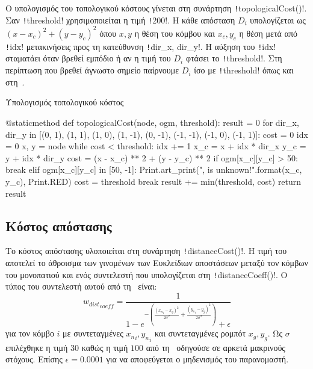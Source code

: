 Ο υπολογισμός του τοπολογικού κόστους γίνεται στη συνάρτηση \texttt!topologicalCost()!.
Σαν \texttt!threshold! χρησιμοποιείται η τιμή \texttt!200!.
Η κάθε απόσταση $D_i$ υπολογίζεται ως $(x-x_c)^2 + (y-y_c)^2$ όπου $x, y$ η θέση του κόμβου και $x_c, y_c$ η θέση μετά από \texttt!idx! μετακινήσεις προς τη κατεύθυνση \texttt!dir_x, dir_y!.
Η αύξηση του \texttt!idx! σταματάει όταν βρεθεί εμπόδιο ή αν η τιμή του $D_i$ φτάσει το \texttt!threshold!.
Στη περίπτωση που βρεθεί άγνωστο σημείο παίρνουμε $D_i$ ίσο με \texttt!threshold! όπως και στη~\cite{etsardou-phd}.
\begin{code}
\caption{Υπολογισμός τοπολογικού κόστος}
\begin{pythoncode}
@staticmethod
def topologicalCost(node, ogm, threshold):
    result = 0
    for dir_x, dir_y in [(0, 1), (1, 1), (1, 0), (1, -1), (0, -1), (-1, -1), (-1, 0), (-1, 1)]:
        cost = 0
        idx = 0
        x, y = node
        while cost < threshold:
            idx += 1
            x_c = x + idx * dir_x
            y_c = y + idx * dir_y
            cost = (x - x_c) ** 2 + (y - y_c) ** 2
            if ogm[x_c][y_c] > 50:
                break
            elif ogm[x_c][y_c] in [50, -1]:
                Print.art_print("{},{} is unknown!".format(x_c, y_c), Print.RED)
                cost = threshold
                break
        result += min(threshold, cost)
    return result
\end{pythoncode}
\end{code}

\subsection{Κόστος απόστασης}\label{section:distance-cost}
Το κόστος απόστασης υλοποιείται στη συνάρτηση \texttt!distanceCost()!.
Η τιμή του αποτελεί το άθροισμα των γινομένων των Ευκλείδιων αποστάσεων μεταξύ τον κόμβων του μονοπατιού και ενός συντελεστή που υπολογίζεται στη \texttt!distanceCoeff()!.
Ο τύπος του συντελεστή αυτού από τη~\cite{etsardou-phd} είναι:
\begin{equation}
    {w_{dist}}_{coeff} = \frac{1}{1 - e^{-\left(
                \frac{\left({x_n}_i - x_g\right)^2}{2 \sigma^2} +
                \frac{\left({y_n}_i - y_g\right)^2}{2 \sigma^2}
                \right)} + \epsilon}
\end{equation}
για τον κόμβο $i$ με συντεταγμένες ${x_n}_i, {y_n}_i$ και συντεταγμένες ρομπότ $x_g, y_g$.
Ως $\sigma$ επιλέχθηκε η τιμή $30$ %
καθώς η τιμή $100$ από τη~\cite{tsardoulias2016cost} οδηγούσε σε αρκετά μακρινούς στόχους.
Επίσης $\epsilon = 0.0001$ για να αποφεύγεται ο μηδενισμός του παρανομαστή.

